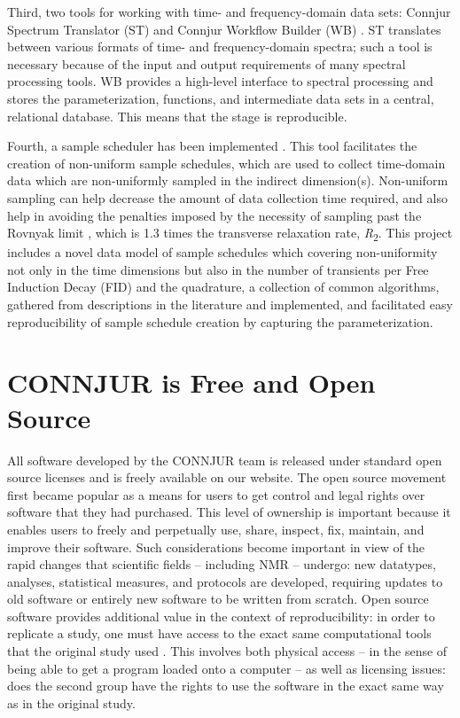 Third, two tools for working with time- and frequency-domain data sets:  
Connjur Spectrum Translator (ST) and Connjur Workflow Builder (WB)
\cite{connjur-wb, connjur-st}.  ST 
translates between various formats of time- and frequency-domain spectra; 
such a tool is necessary because of the input and output requirements of 
many spectral processing tools.  WB provides a high-level interface to 
spectral processing and stores the parameterization, functions, and 
intermediate data sets in a central, relational database.  This means 
that the stage is reproducible.

Fourth, a sample scheduler has been implemented \cite{maciejewski2011random}.  
This tool facilitates the 
creation of non-uniform sample schedules, which are used to collect time-domain 
data which are non-uniformly sampled in the indirect dimension(s).  Non-uniform 
sampling can help decrease the amount of data collection time required, and 
also help in avoiding the penalties imposed by the necessity of sampling past 
the Rovnyak limit \cite{rovnyak2004accelerated}, which is 1.3 times the 
transverse relaxation rate, \textit{R}\textsubscript{2}.  This project includes
a novel data model of sample schedules which covering non-uniformity not 
only in the time dimensions but also in the number of transients per 
Free Induction Decay (FID) and the quadrature, a collection of common 
algorithms, gathered from descriptions in the literature and implemented,
and facilitated easy reproducibility of sample schedule creation by capturing
the parameterization.


\section{CONNJUR is Free and Open Source}
All software developed by the CONNJUR team is released under standard open 
source licenses and is freely available on our website.  The open source 
movement first became popular as a means for users to get control and legal 
rights over software that they had purchased.  This level of ownership is 
important because it enables users to freely and perpetually use, share, 
inspect, fix, maintain, and improve their software.  Such considerations 
become important in view of the rapid changes that scientific fields -- 
including NMR -- undergo: new datatypes, analyses, statistical measures, 
and protocols are developed, requiring updates to old software or entirely 
new software to be written from scratch.  Open source software provides 
additional value in the context of reproducibility: in order to replicate a
study, one must have access to the exact same computational tools that the 
original study used \cite{ince2012open}.  
This involves both physical access -- in the sense of 
being able to get a program loaded onto a computer -- as well as licensing 
issues: does the second group have the rights to use the software in the 
exact same way as in the original study.

